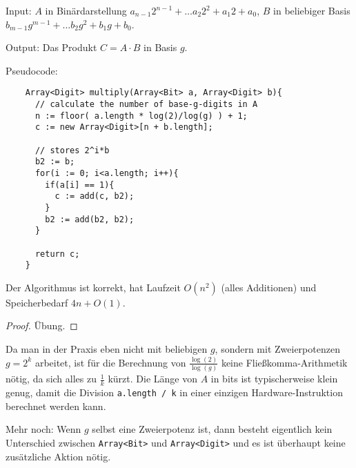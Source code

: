 \begin{algorithm}
    \label{alg:double-and-add}
    Input: $A$ in Binärdarstellung $a_{n-1}2^{n-1}+\ldots a_{2}2^2 +a_1 2 + a_0$, $B$ in beliebiger Basis $b_{m-1} g^{m-1} + \ldots b_2 g^2 + b_1 g+b_0$.

    Output: Das Produkt $C=A\cdot B$ in Basis $g$.

    Pseudocode:
    \begin{lstlisting}
    Array<Digit> multiply(Array<Bit> a, Array<Digit> b){
      // calculate the number of base-g-digits in A
      n := floor( a.length * log(2)/log(g) ) + 1;
      c := new Array<Digit>[n + b.length];

      // stores 2^i*b
      b2 := b;
      for(i := 0; i<a.length; i++){
        if(a[i] == 1){
          c := add(c, b2);
        }
        b2 := add(b2, b2);
      }

      return c;
    }
    \end{lstlisting}
\end{algorithm}

\begin{proposition}\label{alg:double-and-add:correctness}
    Der Algorithmus ist korrekt, hat Laufzeit $O(n^2)$ (alles Additionen) und Speicherbedarf $4n+O(1)$.
\end{proposition}
\begin{proof}
Übung.
\end{proof}

\begin{remark}
    Da man in der Praxis eben nicht mit beliebigen $g$, sondern mit Zweierpotenzen $g=2^k$ arbeitet, ist für die Berechnung von $\frac{\log(2)}{\log(g)}$ keine Fließkomma-Arithmetik nötig, da sich alles zu $\frac{1}{k}$ kürzt. Die Länge von $A$ in bits ist typischerweise klein genug, damit die Division \texttt{a.length / k} in einer einzigen Hardware-Instruktion berechnet werden kann.

    \smallskip
    Mehr noch: Wenn $g$ selbst eine Zweierpotenz ist, dann besteht eigentlich kein Unterschied zwischen \texttt{Array<Bit>} und \texttt{Array<Digit>} und es ist überhaupt keine zusätzliche Aktion nötig.
\end{remark}